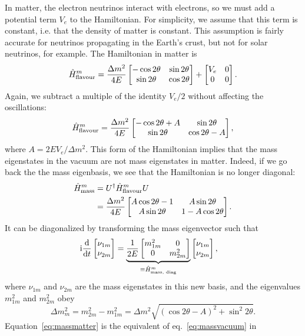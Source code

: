 In matter, the electron neutrinos interact with electrons, so we must add a
potential term $V_e$ to the Hamiltonian. For simplicity, we assume that this
term is constant, i.e. that the density of matter is constant. This assumption
is fairly accurate for neutrinos propagating in the Earth's crust, but not for
solar neutrinos, for example. The Hamiltonian in matter is
\begin{equation}
	\hat{H}^m_\text{flavour} = \frac{\Delta m^2}{4 E} \begin{bmatrix}-\cos 2\theta & \sin
	2\theta \\ \sin 2\theta & \cos 2\theta\end{bmatrix} + \begin{bmatrix}V_e & 0 \\ 0 &
	0\end{bmatrix}.\label{eq:matter_potential}
\end{equation}
Again, we subtract a multiple of the identity $V_e / 2$ without affecting the
oscillations:
\begin{equation}\hat{H}^m_\text{flavour} = \frac{\Delta m^2}{4 E} \begin{bmatrix}-\cos 2\theta + A & \sin
2\theta \\ \sin 2\theta & \cos 2\theta - A\end{bmatrix},\label{eq:flavourmatter1}\end{equation}
where $A = 2 E V_e / \Delta m^2$.
This form of the Hamiltonian implies that the mass eigenstates in the vacuum
are not mass eigenstates in matter. Indeed, if we go back the the mass
eigenbasis, we see that the Hamiltonian is no longer diagonal:
\begin{align*}
	\hat{H}^m_\text{mass} &= U^\dagger \hat{H}^m_\text{flavour} U\\
	&= \frac{\Delta m^2}{4E} \begin{bmatrix}A \cos 2\theta - 1 & A \sin 2\theta \\ A \sin
	2\theta & 1 - A\cos 2\theta\end{bmatrix}.
\end{align*}
It can be diagonalized by transforming the mass eigenvector such that
\begin{align}\mathrm{i} \frac{\mathrm{d}}{\mathrm{d} t} \begin{bmatrix}\nu_{1m} \\ \nu_{2m}\end{bmatrix} &= \underbrace{\frac{1}{2E}
\begin{bmatrix}m^2_{1m} & 0 \\ 0 & m^2_{2m}\end{bmatrix}}_{\equiv \hat{H}^m_\text{mass, diag}}
\begin{bmatrix}\nu_{1m} \\ \nu_{2m}\end{bmatrix},\label{eq:massmatter}\end{align}
where $\nu_{1m}$ and $\nu_{2m}$ are the mass eigenstates in this new basis, and
the eigenvalues $m^2_{1m}$ and $m^2_{2m}$ obey
\begin{equation}\Delta m^2_m = m^2_{2m} - m^2_{1m} = \Delta m^2 \sqrt{(\cos 2\theta - A)^2 +
\sin^2 2\theta}.\label{eq:deltam2m}\end{equation}
Equation~\ref{eq:massmatter} is the equivalent of eq.~\ref{eq:massvacuum} in

